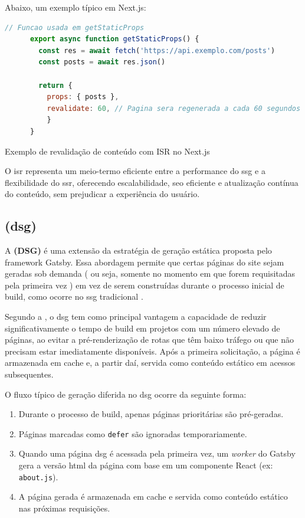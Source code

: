Abaixo, um exemplo típico em Next.js:

\begin{codigo}[H]
  \begin{lstlisting}[language=JavaScript]
      // Funcao usada em getStaticProps
      export async function getStaticProps() {
        const res = await fetch('https://api.exemplo.com/posts')
        const posts = await res.json()

        return {
          props: { posts },
          revalidate: 60, // Pagina sera regenerada a cada 60 segundos
          }
      }
  \end{lstlisting}
  \caption{Exemplo de revalidação de conteúdo com ISR no Next.js}
  \label{cod:isr_next}
\end{codigo}


O \acrshort{isr} representa um meio-termo eficiente entre a performance do \acrshort{ssg} e a flexibilidade do \acrshort{ssr}, oferecendo escalabilidade, \acrshort{seo} eficiente e atualização contínua do conteúdo, sem prejudicar a experiência do usuário.




\subsection{ (\acrshort{dsg})}
\label{subsec:deferred-dsg}

A \textbf{ (DSG)} é uma extensão da estratégia de geração estática proposta pelo framework Gatsby. Essa abordagem permite que certas páginas do site sejam geradas sob demanda ( ou seja, somente no momento em que forem requisitadas pela primeira vez ) em vez de serem construídas durante o processo inicial de build, como ocorre no \acrshort{ssg} tradicional \cite{gatsby2023}.

Segundo a , o \acrshort{dsg} tem como principal vantagem a capacidade de reduzir significativamente o tempo de build em projetos com um número elevado de páginas, ao evitar a pré-renderização de rotas que têm baixo tráfego ou que não precisam estar imediatamente disponíveis. Após a primeira solicitação, a página é armazenada em cache e, a partir daí, servida como conteúdo estático em acessos subsequentes.

O fluxo típico de geração diferida no \acrshort{dsg} ocorre da seguinte forma:

\begin{enumerate}
    \item Durante o processo de build, apenas páginas prioritárias são pré-geradas.
    \item Páginas marcadas como \texttt{defer} são ignoradas temporariamente.
    \item Quando uma página \acrshort{dsg} é acessada pela primeira vez, um \textit{worker} do Gatsby gera a versão \acrshort{html} da página com base em um componente React (ex: \texttt{about.js}).
    \item A página gerada é armazenada em cache e servida como conteúdo estático nas próximas requisições.
\end{enumerate}

